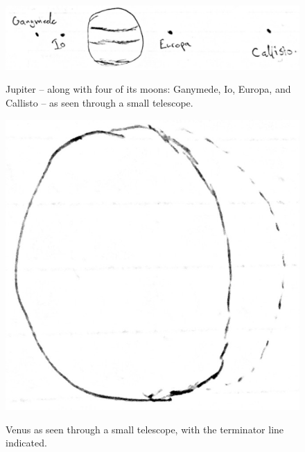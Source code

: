 \documentclass[11pt]{article}
\begin{document}
\begin{figure}[H]
\caption{Jupiter -- along with four of its moons: Ganymede, Io, Europa, and Callisto -- as seen through a small telescope.}
\begin{center}
\includegraphics[scale=0.5]{figures/jupiter.jpg}
\label{fig:jupiter}
\end{center}
\end{figure}

\begin{figure}[H]
\caption{Venus as seen through a small telescope, with the terminator line indicated.}
\begin{center}
\includegraphics[scale=0.5]{figures/venus.jpg}
\label{fig:venus}
\end{center}
\end{figure}
\end{document}
